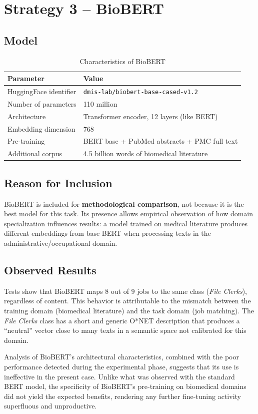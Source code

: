 \documentclass[12pt, a4paper]{report}
\begin{document}
% 
\section{Strategy 3 -- BioBERT}

\subsection{Model}

\begin{table}[H]
\centering
\begin{tabular}{ll}
\toprule
\textbf{Parameter} & \textbf{Value} \\
\midrule
HuggingFace identifier & \texttt{dmis-lab/biobert-base-cased-v1.2} \\
Number of parameters & 110 million \\
Architecture & Transformer encoder, 12 layers (like BERT) \\
Embedding dimension & 768 \\
Pre-training & BERT base + PubMed abstracts + PMC full text \\
Additional corpus & 4.5 billion words of biomedical literature \\
\bottomrule
\end{tabular}
\caption{Characteristics of BioBERT}
\end{table}

\subsection{Reason for Inclusion}

BioBERT is included for \textbf{methodological comparison}, not because
it is the best model for this task. Its presence allows empirical
observation of how domain specialization influences
results: a model trained on medical literature produces
different embeddings from base BERT when processing texts in the
administrative/occupational domain.

\subsection{Observed Results}

Tests show that BioBERT maps 8 out of 9 jobs to the same class
(\textit{File Clerks}), regardless of content. This
behavior is attributable to the mismatch between the training domain
(biomedical literature) and the task domain (job matching). The
\textit{File Clerks} class has a short and generic O*NET description
that produces a ``neutral'' vector close to many texts in a semantic
space not calibrated for this domain.
\\
\begin{warnbox}
    Analysis of BioBERT's architectural characteristics, combined with the poor performance detected during the experimental phase, suggests that its use is ineffective in the present case. Unlike what was observed with the standard BERT model, the specificity of BioBERT's pre-training on biomedical domains did not yield the expected benefits, rendering any further fine-tuning activity superfluous and unproductive.
\end{warnbox}
\end{document}
